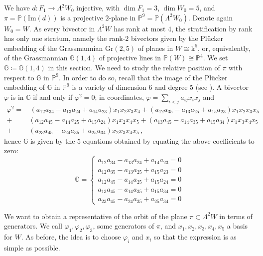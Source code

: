 \documentclass[10pt,reqno]{amsart}
\newcommand{\GG}{\mathbb{G}}
\newcommand{\PP}{\mathbb P}
\newcommand{\f}{\varphi}
\renewcommand{\L}{\Lambda}
\newcommand{\kk}{\mathrm{k}}
\newcommand{\tr}[1]{\textrm{#1}}
\theoremstyle{definition}
\begin{document}
We have $d\colon F_1 \to \L^2 W_0$ injective, with $\dim F_1=3$, $\dim W_0=5$, and $\pi=\PP(\tr{Im}(d))$ is a projective $2$-plane in $\PP^9=\PP(\L^2 W_0)$. Denote again $W_0=W$. As every bivector in $\L^2 W$ has rank at most $4$, the stratification by rank has only one stratum, namely the rank-$2$ bivectors given by the Plücker embedding of the Grassmannian $\tr{Gr}(2,5)$ of planes in $W \cong \kk^5$, or, equivalently, of the Grassmannian $\GG(1,4)$ of projective lines in $\PP(W) \cong \PP^4$. We set $\GG \coloneqq \GG(1,4)$ in this section. We need to study the relative position of $\pi$ with respect to $\GG$ in $\PP^9$. In order to do so, recall that the image of the Plücker embedding of $\GG$ in $\PP^9$ is a variety of dimension $6$ and degree $5$ (see \cite{Harris}). A bivector $\f$ is in $\GG$ if and only if $\f^2=0$; in coordinates, 
$\f=\sum_{i<j} a_{ij} x_i x_j$ and
\begin{align*} 
    \f^2= & \,  (a_{12}a_{34}-a_{13}a_{24}+a_{14}a_{23})x_1x_2x_3x_4+(a_{12}a_{35}-a_{13}a_{25}+a_{15}a_{23})x_1x_2x_3x_5  \\  
    + & (a_{12}a_{45}-a_{14}a_{25}+a_{15}a_{24})x_1x_2x_4x_5 +(a_{13}a_{45}-a_{14}a_{35}+a_{15}a_{34})x_1x_3x_4x_5 \\ 
    + & (a_{23}a_{45}-a_{24}a_{35}+a_{25}a_{34})x_2x_3x_4x_5\,,
\end{align*}
hence $\GG$ is given by the $5$ equations obtained by equating the above coefficients to zero:
\begin{equation}\label{eq:G(2,5)}
\GG=\begin{cases}
a_{12}a_{34}-a_{13}a_{24}+a_{14}a_{23}=0 \\
a_{12}a_{35}-a_{13}a_{25}+a_{15}a_{23}=0 \\
a_{12}a_{45}-a_{14}a_{25}+a_{15}a_{24}=0 \\
a_{13}a_{45}-a_{14}a_{35}+a_{15}a_{34}=0 \\
a_{23}a_{45}-a_{24}a_{35}+a_{25}a_{34}=0
\end{cases}    
\end{equation}




\noindent We want to obtain a representative of the orbit of the plane $\pi \subset \L^2 W$ in terms of generators.
We call $\f_1, \f_2, \f_3$, some generators of $\pi$, and $x_1, x_2,x_3,x_4,x_5$ a basis for $W$. As before, the idea is to choose $\f_i$ and $x_i$ so that the expression is as simple as possible.
\end{document}
